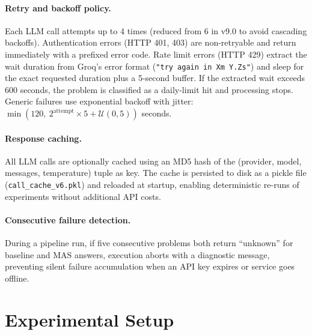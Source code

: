 \documentclass[11pt,a4paper]{article}
\begin{document}
\paragraph{Retry and backoff policy.}
Each LLM call attempts up to 4 times (reduced from 6 in v9.0 to avoid cascading backoffs).
Authentication errors (HTTP 401, 403) are non-retryable and return immediately with a prefixed error code.
Rate limit errors (HTTP 429) extract the wait duration from Groq's error format (\texttt{"try again in Xm Y.Zs"}) and sleep for the exact requested duration plus a 5-second buffer.
If the extracted wait exceeds 600 seconds, the problem is classified as a daily-limit hit and processing stops.
Generic failures use exponential backoff with jitter: $\min(120,\ 2^{\text{attempt}} \times 5 + \mathcal{U}(0, 5))$ seconds.
\paragraph{Response caching.}
All LLM calls are optionally cached using an MD5 hash of the (provider, model, messages, temperature) tuple as key.
The cache is persisted to disk as a pickle file (\texttt{call\_cache\_v6.pkl}) and reloaded at startup, enabling deterministic re-runs of experiments without additional API costs.
\paragraph{Consecutive failure detection.}
During a pipeline run, if five consecutive problems both return ``unknown'' for baseline and MAS answers, execution aborts with a diagnostic message, preventing silent failure accumulation when an API key expires or service goes offline.
\section{Experimental Setup}
\label{sec:experiments}
\end{document}
